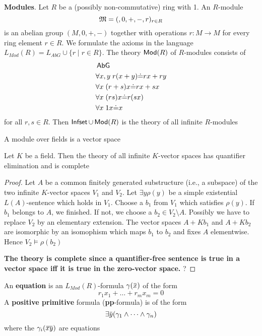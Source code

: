 \documentclass[11pt]{article}
\begin{document}
\textbf{Modules}. Let \(R\) be a (possibly non-commutative) ring with 1. An
\(R\)-module
\begin{equation*}
\mathfrak{M}=(,0,+,-,r)_{r\in R}
\end{equation*}
is an abelian group \((M,0,+,-)\) together with operations \(r:M\to M\) for
every ring element \(r\in R\). We formulate the axioms in the language
\(L_{Mod}(R)=L_{AbG}\cup\{r\mid r\in R\}\). The theory \(\operatorname{\textsf{Mod}}(R)\) of
\(R\)-modules consists of
\begin{align*}
&\operatorname{\textsf{AbG}}\\
&\forall x,y\; r(x+y)\dot{=}rx+ry\\
&\forall x\;(r+s)x\dot{=}rx+sx\\
&\forall x\;(rs)x\dot{=}r(sx)\\
&\forall x\;1x\dot{=}x
\end{align*}
for all \(r,s\in R\). Then \(\operatorname{\textsf{Infset}}\cup\operatorname{\textsf{Mod}}(R)\) is the theory of all
infinite \(R\)-modules

A module over fields is a vector space

\begin{theorem}[]
Let \(K\) be a field. Then the theory of all infinite \(K\)-vector spaces has
quantifier elimination and is complete
\end{theorem}

\begin{proof}
Let \(A\) be a common finitely generated substructure (i.e., a subspace) of
the two infinite \(K\)-vector spaces \(V_1\) and \(V_2\). Let \(\exists y\rho(y)\) be a simple
existential \(L(A)\)-sentence which holds in \(V_1\).
Choose a \(b_1\) from \(V_1\) which satisfies \(\rho(y)\). If \(b_1\) belongs to
\(A\), we finished. If not, we choose a \(b_2\in V_2\setminus A\). Possibly
we have to replace \(V_2\) by an elementary extension. The vector spaces
\(A+Kb_1\) and \(A+Kb_2\) are isomorphic by an isomophism which maps \(b_1\)
to \(b_2\) and fixes \(A\) elementwise. Hence \(V_2\vDash\rho(b_2)\)

\textbf{The theory is complete since a quantifier-free sentence is true in a vector
space iff it is true in the zero-vector space.} ?
\end{proof}

\begin{definition}[]
An \textbf{equation} is an \(L_{Mod}(R)\)-formula \(\gamma(\bbar{x})\) of the form
\begin{equation*}
r_1x_1+\dots+r_mx_m=0
\end{equation*}
A \textbf{positive primitive} formula (\textbf{pp}-formula) is of the form
\begin{equation*}
\exists\bbar{y}(\gamma_1\wedge\dots\wedge\gamma_n)
\end{equation*}
where the \(\gamma_i(\bbar{xy})\) are equations
\end{definition}
\end{document}

